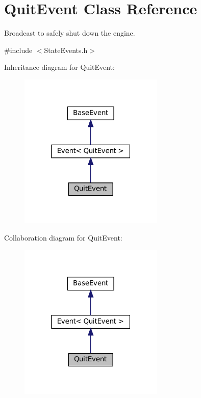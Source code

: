 \hypertarget{classQuitEvent}{}\section{Quit\+Event Class Reference}
\label{classQuitEvent}


Broadcast to safely shut down the engine.  




{\ttfamily \#include $<$State\+Events.\+h$>$}



Inheritance diagram for Quit\+Event\+:
\nopagebreak
\begin{figure}[H]
\begin{center}
\leavevmode
\includegraphics[width=195pt]{classQuitEvent__inherit__graph}
\end{center}
\end{figure}


Collaboration diagram for Quit\+Event\+:
\nopagebreak
\begin{figure}[H]
\begin{center}
\leavevmode
\includegraphics[width=195pt]{classQuitEvent__coll__graph}
\end{center}
\end{figure}
